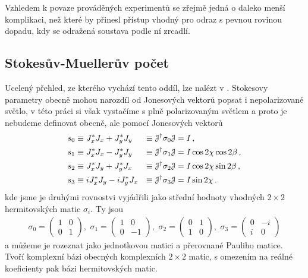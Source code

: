 Vzhledem k povaze prováděných experimentů se zřejmě jedná o daleko menší komplikaci, než které by přinesl přístup vhodný pro odraz s pevnou rovinou dopadu, kdy se odražená soustava podle ní zrcadlí.


\subsection{Stokesův-Muellerův počet}
\label{chap:Stokes-Mueller}

Ucelený přehled, ze kterého vychází tento oddíl, lze nalézt v \cite{gilReviewMuellerMatrix2014,ossikovskiPoincareSphereMapping2013}.
Stokesovy parametry obecně mohou narozdíl od Jonesových vektorů popsat i nepolarizované světlo,
v této práci si však vystačíme s plně polarizovaným světlem a proto je nebudeme definovat obecně, ale pomocí Jonesových vektorů
\begin{alignat}{3}
    s_0 &\equiv J_x^* J_x+J_y^* J_y &\equiv \mathcal{J}^\dagger \sigma_0 \mathcal{J} &= I \,,\\
    s_1 &\equiv J_x^* J_x-J_y^* J_y &\equiv \mathcal{J}^\dagger \sigma_1 \mathcal{J} &= I \cos 2\chi \cos 2\beta \,,  \\
    s_2 &\equiv J_x^* J_y+J_y^* J_x &\equiv \mathcal{J}^\dagger \sigma_2 \mathcal{J} &= I \cos 2\chi \sin 2\beta \,, \\
    s_3 &\equiv i J_x^* J_y-i J_y^* J_x  &\equiv \mathcal{J}^\dagger \sigma_3 \mathcal{J} &= I \sin 2\chi \,.
\end{alignat}
kde jsme je druhými rovnostvi vyjádřili jako střední hodnoty vhodných $2\times 2$ hermitovských matic $\sigma_{i}$. Ty jsou
\begin{align}
    \sigma_0=\begin{pmatrix} 1 & 0 \\ 0 & 1 \end{pmatrix} ,\,\,
    \sigma_1=\begin{pmatrix} 1 & 0 \\ 0 & -1 \end{pmatrix} ,\,\,
    \sigma_2=\begin{pmatrix} 0 & 1 \\ 1 & 0 \end{pmatrix} ,\,\,
    \sigma_3=\begin{pmatrix} 0 & -i \\ i & 0 \end{pmatrix}
\end{align}
a můžeme je rozeznat jako jednotkovou matici a přerovnané Pauliho matice.
Tvoří komplexní bázi obecných komplexních $2\times 2$ matic, s omezením na reálné koeficienty pak bázi hermitovských matic. 

